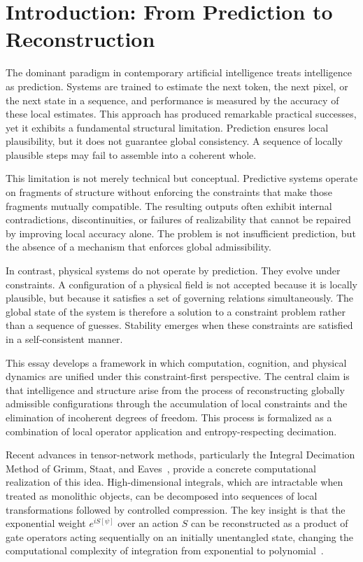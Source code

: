 \documentclass[11pt]{article}
\theoremstyle{definition}
\begin{document}
\newpage
\tableofcontents
\newpage

\section{Introduction: From Prediction to Reconstruction}

The dominant paradigm in contemporary artificial intelligence treats
intelligence as prediction. Systems are trained to estimate the next token, the
next pixel, or the next state in a sequence, and performance is measured by the
accuracy of these local estimates. This approach has produced remarkable
practical successes, yet it exhibits a fundamental structural limitation.
Prediction ensures local plausibility, but it does not guarantee global
consistency. A sequence of locally plausible steps may fail to assemble into a
coherent whole.

This limitation is not merely technical but conceptual. Predictive systems
operate on fragments of structure without enforcing the constraints that make
those fragments mutually compatible. The resulting outputs often exhibit
internal contradictions, discontinuities, or failures of realizability that
cannot be repaired by improving local accuracy alone. The problem is not
insufficient prediction, but the absence of a mechanism that enforces global
admissibility.

In contrast, physical systems do not operate by prediction. They evolve under
constraints. A configuration of a physical field is not accepted because it is
locally plausible, but because it satisfies a set of governing relations
simultaneously. The global state of the system is therefore a solution to a
constraint problem rather than a sequence of guesses. Stability emerges when
these constraints are satisfied in a self-consistent manner.

This essay develops a framework in which computation, cognition, and physical
dynamics are unified under this constraint-first perspective. The central claim
is that intelligence and structure arise from the process of reconstructing
globally admissible configurations through the accumulation of local constraints
and the elimination of incoherent degrees of freedom. This process is formalized
as a combination of local operator application and entropy-respecting decimation.

Recent advances in tensor-network methods, particularly the Integral Decimation
Method of Grimm, Staat, and Eaves~\cite{grimm2026}, provide a concrete
computational realization of this idea. High-dimensional integrals, which are
intractable when treated as monolithic objects, can be decomposed into sequences
of local transformations followed by controlled compression. The key insight is
that the exponential weight $e^{iS[\psi]}$ over an action $S$ can be
reconstructed as a product of gate operators acting sequentially on an initially
unentangled state, changing the computational complexity of integration from
exponential to polynomial~\cite{grimm2026, oseledets2011tt}.
\end{document}
